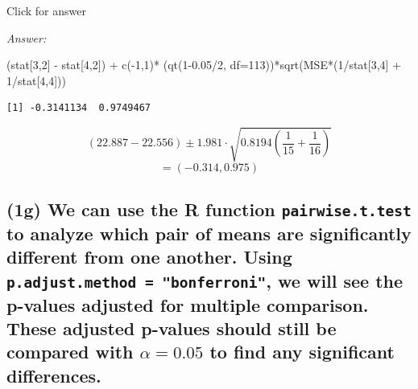 \documentclass[
]{book}
\newenvironment{Shaded}{\begin{snugshade}}{\end{snugshade}}
\newcommand{\AttributeTok}[1]{\textcolor[rgb]{0.77,0.63,0.00}{#1}}
\newcommand{\DecValTok}[1]{\textcolor[rgb]{0.00,0.00,0.81}{#1}}
\newcommand{\FloatTok}[1]{\textcolor[rgb]{0.00,0.00,0.81}{#1}}
\newcommand{\FunctionTok}[1]{\textcolor[rgb]{0.00,0.00,0.00}{#1}}
\newcommand{\NormalTok}[1]{#1}
\newcommand{\SpecialCharTok}[1]{\textcolor[rgb]{0.00,0.00,0.00}{#1}}
\begin{document}
Click for answer

\emph{Answer:}

\begin{Shaded}
\begin{Highlighting}[]
\NormalTok{(stat[}\DecValTok{3}\NormalTok{,}\DecValTok{2}\NormalTok{] }\SpecialCharTok{{-}}\NormalTok{ stat[}\DecValTok{4}\NormalTok{,}\DecValTok{2}\NormalTok{]) }\SpecialCharTok{+} \FunctionTok{c}\NormalTok{(}\SpecialCharTok{{-}}\DecValTok{1}\NormalTok{,}\DecValTok{1}\NormalTok{)}\SpecialCharTok{*}\NormalTok{ (}\FunctionTok{qt}\NormalTok{(}\DecValTok{1}\FloatTok{{-}0.05}\SpecialCharTok{/}\DecValTok{2}\NormalTok{, }\AttributeTok{df=}\DecValTok{113}\NormalTok{))}\SpecialCharTok{*}\FunctionTok{sqrt}\NormalTok{(MSE}\SpecialCharTok{*}\NormalTok{(}\DecValTok{1}\SpecialCharTok{/}\NormalTok{stat[}\DecValTok{3}\NormalTok{,}\DecValTok{4}\NormalTok{] }\SpecialCharTok{+} \DecValTok{1}\SpecialCharTok{/}\NormalTok{stat[}\DecValTok{4}\NormalTok{,}\DecValTok{4}\NormalTok{]))}
\end{Highlighting}
\end{Shaded}

\begin{verbatim}
[1] -0.3141134  0.9749467
\end{verbatim}

\[(22.887 - 22.556) \pm 1.981\cdot \sqrt{0.8194\left(\frac{1}{15} + \frac{1}{16} \right)}\]
\[ = (-0.314, 0.975)\]

\hypertarget{g-we-can-use-the-r-function-pairwise.t.test-to-analyze-which-pair-of-means-are-significantly-different-from-one-another.-using-p.adjust.method-bonferroni-we-will-see-the-p-values-adjusted-for-multiple-comparison.-these-adjusted-p-values-should-still-be-compared-with-alpha-0.05-to-find-any-significant-differences.}{%
\subsection{\texorpdfstring{(1g) We can use the R function \texttt{pairwise.t.test} to analyze which pair of means are significantly different from one another. Using \texttt{p.adjust.method\ =\ "bonferroni"}, we will see the p-values adjusted for multiple comparison. These adjusted p-values should still be compared with \(\alpha = 0.05\) to find any significant differences.}{(1g) We can use the R function pairwise.t.test to analyze which pair of means are significantly different from one another. Using p.adjust.method = "bonferroni", we will see the p-values adjusted for multiple comparison. These adjusted p-values should still be compared with \textbackslash alpha = 0.05 to find any significant differences.}}\label{g-we-can-use-the-r-function-pairwise.t.test-to-analyze-which-pair-of-means-are-significantly-different-from-one-another.-using-p.adjust.method-bonferroni-we-will-see-the-p-values-adjusted-for-multiple-comparison.-these-adjusted-p-values-should-still-be-compared-with-alpha-0.05-to-find-any-significant-differences.}}
\end{document}
